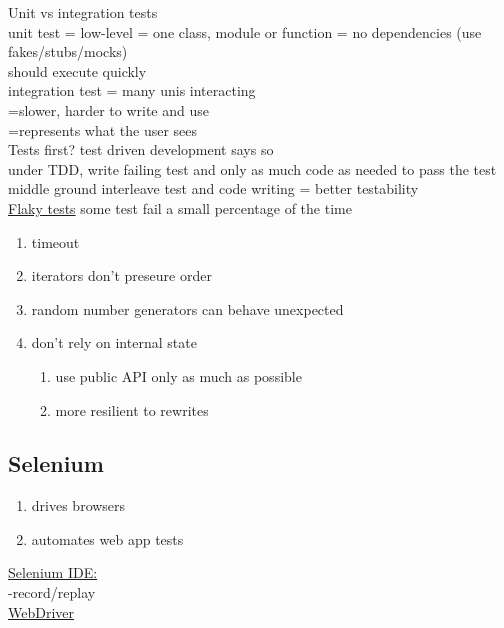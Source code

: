 \documentclass[10pt,usletter]{article}
\newcommand{\tab}[1][1cm]{\hspace*{#1}}
\begin{document}
Unit vs integration tests\\
unit test = low-level = one class, module or function = no dependencies (use fakes/stubs/mocks)\\
\tab should execute quickly\\
integration test = many unis interacting\\
=slower, harder to write and use\\
=represents what the user sees\\

Tests first?
test driven development says so\\
under TDD, write failing test and only as much code as needed to pass the test\\
middle ground interleave test and code writing = better testability\\
\underline{Flaky tests}
some test fail a small percentage of the time 
\begin{enumerate}
\item timeout
\item iterators don't preseure order
\item random number generators can behave unexpected
\item don't rely on internal state
\begin{enumerate}
\item use public API only as much as possible
\item more resilient to rewrites
\end{enumerate}
\end{enumerate}

\subsection{Selenium}
\begin{enumerate}
\item drives browsers
\item automates web app tests
\end{enumerate}
\underline{Selenium IDE:}\\
-record/replay\\
\underline{WebDriver}
\end{document}
